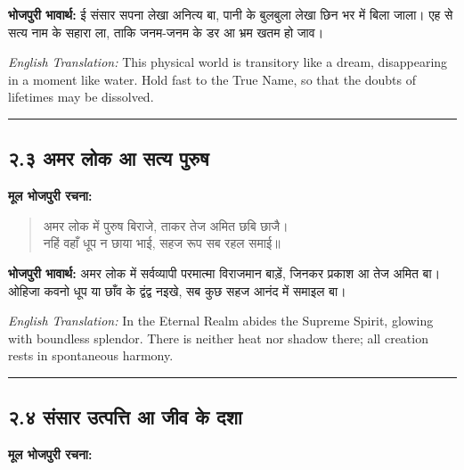 \textbf{भोजपुरी भावार्थ:} ई संसार सपना लेखा अनित्य बा, पानी के बुलबुला लेखा छिन भर में बिला जाला। एह से सत्य नाम के सहारा ला, ताकि जनम-जनम के डर आ भ्रम खतम हो जाव।

\begin{sloppypar}
{\engfont \textit{English Translation:} This physical world is transitory like a dream, disappearing in a moment like water.
Hold fast to the True Name, so that the doubts of lifetimes may be dissolved.}
\end{sloppypar}

\begin{center}
{\color{bordercolor}\rule{0.4\textwidth}{0.4pt}}
\end{center}

\subsection*{२.३ अमर लोक आ सत्य पुरुष}

\textbf{मूल भोजपुरी रचना:}

\begin{quote}
अमर लोक में पुरुष बिराजे, ताकर तेज अमित छबि छाजै।\\
नहिं वहाँ धूप न छाया भाई, सहज रूप सब रहल समाई॥
\end{quote}

\textbf{भोजपुरी भावार्थ:} अमर लोक में सर्वव्यापी परमात्मा विराजमान बाड़ें, जिनकर प्रकाश आ तेज अमित बा। ओहिजा कवनो धूप या छाँव के द्वंद्व नइखे, सब कुछ सहज आनंद में समाइल बा।

\begin{sloppypar}
{\engfont \textit{English Translation:} In the Eternal Realm abides the Supreme Spirit, glowing with boundless splendor.
There is neither heat nor shadow there; all creation rests in spontaneous harmony.}
\end{sloppypar}

\begin{center}
{\color{bordercolor}\rule{0.4\textwidth}{0.4pt}}
\end{center}

\subsection*{२.४ संसार उत्पत्ति आ जीव के दशा}

\textbf{मूल भोजपुरी रचना:}

